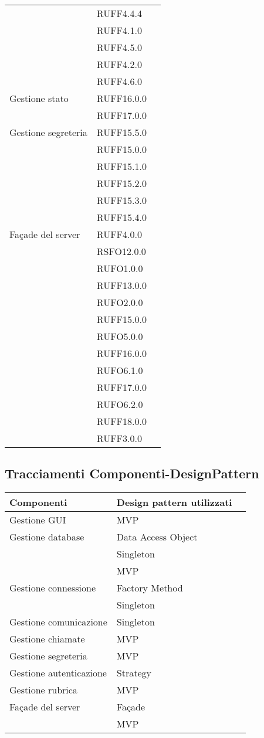 \begin{center}
\begin{longtable}{lp{}l}
 & RUFF4.4.4 \\
 & RUFF4.1.0 \\
 & RUFF4.5.0 \\
 & RUFF4.2.0 \\
 & RUFF4.6.0 \\
Gestione stato & RUFF16.0.0 \\
 & RUFF17.0.0 \\
Gestione segreteria & RUFF15.5.0 \\
 & RUFF15.0.0 \\
 & RUFF15.1.0 \\
 & RUFF15.2.0 \\
 & RUFF15.3.0 \\
 & RUFF15.4.0 \\
Façade del server & RUFF4.0.0 \\
 & RSFO12.0.0 \\
 & RUFO1.0.0 \\
 & RUFF13.0.0 \\
 & RUFO2.0.0 \\
 & RUFF15.0.0 \\
 & RUFO5.0.0 \\
 & RUFF16.0.0 \\
 & RUFO6.1.0 \\
 & RUFF17.0.0 \\
 & RUFO6.2.0 \\
 & RUFF18.0.0 \\
 & RUFF3.0.0 \\
\bottomrule
\end{longtable}
\end{center}
\subsection{Tracciamenti Componenti-DesignPattern}\label{sec:tracCompDp}

\begin{center}
\begin{longtable}{lp{}l}
\toprule Componenti & Design pattern utilizzati\\
\midrule
Gestione GUI & MVP \\
Gestione database & Data Access Object \\
& Singleton \\
& MVP \\
Gestione connessione & Factory Method \\
 & Singleton \\
Gestione comunicazione & Singleton \\
Gestione chiamate & MVP \\
Gestione segreteria & MVP \\
Gestione autenticazione & Strategy \\
Gestione rubrica & MVP \\
Façade del server & Façade \\
& MVP \\
\bottomrule
\end{longtable}
\end{center}
